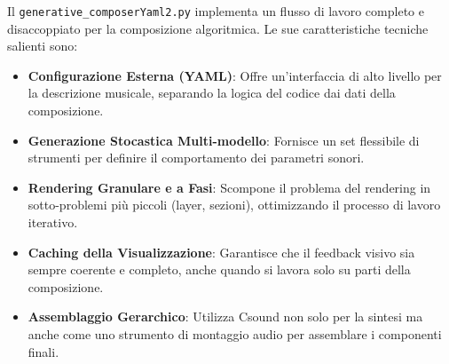 Il \texttt{generative\_composerYaml2.py} implementa un flusso di lavoro completo e disaccoppiato per la composizione algoritmica. Le sue caratteristiche tecniche salienti sono:

\begin{itemize}
 \item \textbf{Configurazione Esterna (YAML)}: Offre un'interfaccia di alto livello per la descrizione musicale, separando la logica del codice dai dati della composizione.
 \item \textbf{Generazione Stocastica Multi-modello}: Fornisce un set flessibile di strumenti per definire il comportamento dei parametri sonori.
 \item \textbf{Rendering Granulare e a Fasi}: Scompone il problema del rendering in sotto-problemi più piccoli (layer, sezioni), ottimizzando il processo di lavoro iterativo.
 \item \textbf{Caching della Visualizzazione}: Garantisce che il feedback visivo sia sempre coerente e completo, anche quando si lavora solo su parti della composizione.
 \item \textbf{Assemblaggio Gerarchico}: Utilizza Csound non solo per la sintesi ma anche come uno strumento di montaggio audio per assemblare i componenti finali.
\end{itemize}